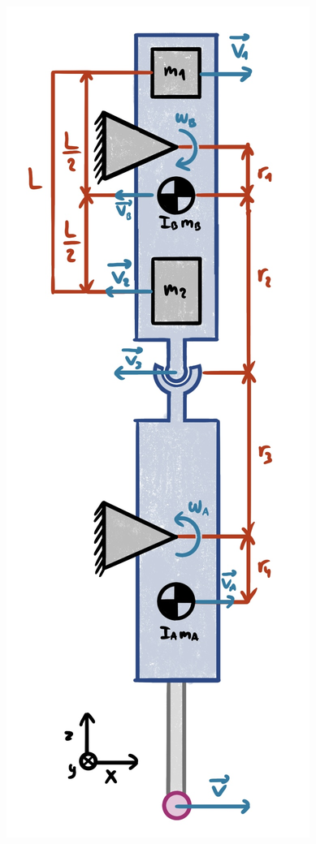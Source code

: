 \documentclass[a4paper, 11pt]{article} %
\begin{document}
\hfill
\begin{minipage}[t]{0.3\textwidth}
    \begin{figure}[H]
        \centering
        \includegraphics[width=\linewidth]{IMG_0691.jpeg}

\end{figure}
\end{minipage}
\end{document}
